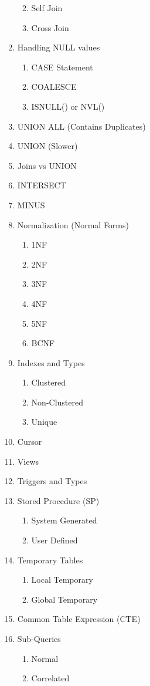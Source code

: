 \documentclass[11pt]{article}
\begin{document}
\begin{enumerate}
\begin{enumerate}
\begin{enumerate}
   	\end{enumerate}
   \item Self Join
   \item Cross Join
   \end{enumerate}
    \item Handling NULL values
    \begin{enumerate}
    	\item CASE Statement
    	\item COALESCE
    	\item ISNULL() or NVL()
    \end{enumerate}
    \item UNION ALL (Contains Duplicates)
    \item UNION (Slower)
    \item Joins vs UNION
    \item INTERSECT
    \item MINUS
	\item Normalization (Normal Forms)
	\begin{enumerate}
		\item 1NF
		\item 2NF
		\item 3NF
		\item 4NF
		\item 5NF
		\item BCNF		
	\end{enumerate}
\item Indexes and Types
\begin{enumerate}
	\item Clustered
	\item Non-Clustered
	\item Unique
\end{enumerate}
\item Cursor
\item Views
\item Triggers and Types
\item Stored Procedure (SP)
\begin{enumerate}
	\item System Generated
	\item User Defined
\end{enumerate}
\item Temporary Tables
\begin{enumerate}
	\item Local Temporary
	\item Global Temporary
\end{enumerate}
\item Common Table Expression (CTE)
\item Sub-Queries
\begin{enumerate}
	\item Normal
	\item Correlated
\end{enumerate}

\end{enumerate}
\end{document}
